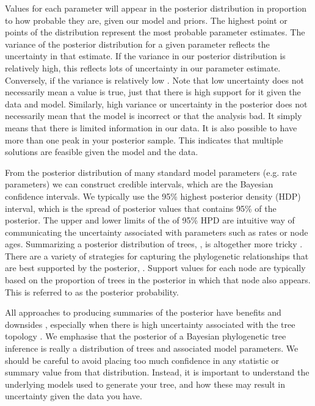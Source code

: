 Values for each parameter will appear in the posterior distribution in proportion to how probable they are, given our model and priors.
The highest point or points of the distribution represent the most probable parameter estimates.
The variance of the posterior distribution for a given parameter reflects the uncertainty in that estimate.
If the variance in our posterior distribution is relatively high, this reflects lots of uncertainty in our parameter estimate.
Conversely, if the variance is relatively low .
Note that low uncertainty does not necessarily mean a value is true, just that there is high support for it given the data and model.
Similarly, high variance or uncertainty in the posterior does not necessarily mean that the model is incorrect or that the analysis  bad. It simply means that there is limited information in our data.
It is also possible to have more than one peak in your posterior sample.
This indicates that multiple solutions are feasible given the model and the data.

From the posterior distribution of many standard model parameters (e.g. rate parameters) we can construct credible intervals, which are the Bayesian  confidence intervals.  
We typically use the 95\% highest posterior density (HDP) interval, which is the spread of posterior values that contains 95\% of the posterior.
The upper and lower limits of the of 95\% HPD are  intuitive way of communicating the uncertainty associated with parameters such as rates or node ages.
Summarizing a posterior distribution of trees, , is altogether more tricky \citep{heled2013,OReilly2018}.
There are a variety of strategies for capturing the phylogenetic relationships that are best supported by the posterior, .
Support values for each node are typically based on the proportion of trees in the posterior in which that node also appears. 
This is referred to as the posterior probability. 

All approaches to producing summaries of the posterior have benefits and downsides \citep{heled2013}, especially when there is high uncertainty associated with the tree topology \citep{OReilly2018}.
We emphasise that the posterior of a Bayesian phylogenetic tree inference is really a distribution of trees and associated model parameters. 
We should be careful to avoid placing too much confidence in any statistic or summary value from that distribution.
Instead, it is important to understand the underlying models used to generate your tree, and how these may result in uncertainty given the data you have.

